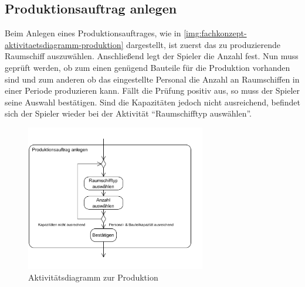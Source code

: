 \subsection{Produktionsauftrag anlegen}
\label{sec:fachkonzept-aktivitaetsdiagramm-produktion}

Beim Anlegen eines Produktionsauftrages, wie in \vref{img:fachkonzept-aktivitaetsdiagramm-produktion} dargestellt, ist zuerst das zu produzierende Raumschiff auszuwählen. Anschließend legt der Spieler die Anzahl fest. Nun muss geprüft werden, ob zum einen genügend Bauteile für die Produktion vorhanden sind und zum anderen ob das eingestellte Personal die Anzahl an Raumschiffen in einer Periode produzieren kann. Fällt die Prüfung positiv aus, so muss der Spieler seine Auswahl bestätigen. Sind die Kapazitäten jedoch nicht ausreichend, befindet sich der Spieler wieder bei der Aktivität “Raumschifftyp auswählen”.

\begin{figure}[h]
  \centering
    \includegraphics[trim = 0cm 1cm 1cm 1cm, width=0.7\textwidth]{30_Fachkonzept/15_aktivitaetsdiagramm/activity4.pdf}
  \caption{Aktivitätsdiagramm zur Produktion}
  \label{img:fachkonzept-aktivitaetsdiagramm-produktion}
\end{figure}